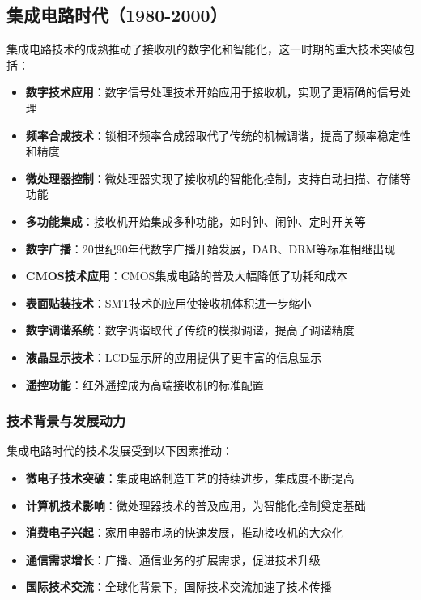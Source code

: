 \documentclass[12pt,UTF8]{ctexbook}
\begin{document}
\subsection{集成电路时代（1980-2000）}

集成电路技术的成熟推动了接收机的数字化和智能化，这一时期的重大技术突破包括：

\begin{itemize}[leftmargin=3.5em]
    \item \textbf{数字技术应用}：数字信号处理技术开始应用于接收机，实现了更精确的信号处理
    \item \textbf{频率合成技术}：锁相环频率合成器取代了传统的机械调谐，提高了频率稳定性和精度
    \item \textbf{微处理器控制}：微处理器实现了接收机的智能化控制，支持自动扫描、存储等功能
    \item \textbf{多功能集成}：接收机开始集成多种功能，如时钟、闹钟、定时开关等
    \item \textbf{数字广播}：20世纪90年代数字广播开始发展，DAB、DRM等标准相继出现
    \item \textbf{CMOS技术应用}：CMOS集成电路的普及大幅降低了功耗和成本
    \item \textbf{表面贴装技术}：SMT技术的应用使接收机体积进一步缩小
    \item \textbf{数字调谐系统}：数字调谐取代了传统的模拟调谐，提高了调谐精度
    \item \textbf{液晶显示技术}：LCD显示屏的应用提供了更丰富的信息显示
    \item \textbf{遥控功能}：红外遥控成为高端接收机的标准配置
\end{itemize}

\subsubsection{技术背景与发展动力}

集成电路时代的技术发展受到以下因素推动：

\begin{itemize}[leftmargin=3.5em]
    \item \textbf{微电子技术突破}：集成电路制造工艺的持续进步，集成度不断提高
    \item \textbf{计算机技术影响}：微处理器技术的普及应用，为智能化控制奠定基础
    \item \textbf{消费电子兴起}：家用电器市场的快速发展，推动接收机的大众化
    \item \textbf{通信需求增长}：广播、通信业务的扩展需求，促进技术升级
    \item \textbf{国际技术交流}：全球化背景下，国际技术交流加速了技术传播
\end{itemize}
\end{document}
